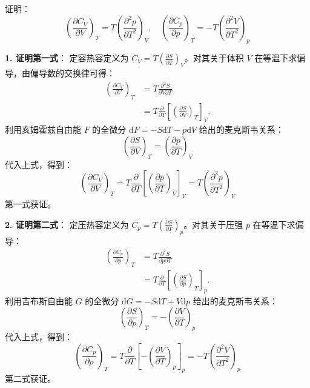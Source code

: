 \begin{exercise}\label{ex:12.11}
证明：
$$ \left(\frac{\partial C_V}{\partial V}\right)_T = T \left(\frac{\partial^2 p}{\partial T^2}\right)_V, \quad \left(\frac{\partial C_p}{\partial p}\right)_T = -T \left(\frac{\partial^2 V}{\partial T^2}\right)_p $$
\end{exercise}
\begin{solution}
\textbf{1. 证明第一式}：
定容热容定义为 $C_V = T \left(\frac{\partial S}{\partial T}\right)_V$。对其关于体积 $V$ 在等温下求偏导，由偏导数的交换律可得：
\[
\begin{aligned}
\left(\frac{\partial C_V}{\partial V}\right)_T
 &=T\frac{\partial^2S}{\partial V\partial T}\\
 &=T\frac{\partial}{\partial T}
   \left[\left(\frac{\partial S}{\partial V}\right)_T\right]_V.
\end{aligned}
\]
利用亥姆霍兹自由能 $F$ 的全微分 $\mathrm{d}F = -S\mathrm{d}T - p\mathrm{d}V$ 给出的麦克斯韦关系：
$$ \left(\frac{\partial S}{\partial V}\right)_T = \left(\frac{\partial p}{\partial T}\right)_V $$
代入上式，得到：
$$ \left(\frac{\partial C_V}{\partial V}\right)_T = T \frac{\partial}{\partial T} \left[ \left(\frac{\partial p}{\partial T}\right)_V \right]_V = T \left(\frac{\partial^2 p}{\partial T^2}\right)_V $$
第一式获证。

\textbf{2. 证明第二式}：
定压热容定义为 $C_p = T \left(\frac{\partial S}{\partial T}\right)_p$。对其关于压强 $p$ 在等温下求偏导：
\[
\begin{aligned}
\left(\frac{\partial C_p}{\partial p}\right)_T
 &=T\frac{\partial^2S}{\partial p\partial T}\\
 &=T\frac{\partial}{\partial T}
   \left[\left(\frac{\partial S}{\partial p}\right)_T\right]_p.
\end{aligned}
\]
利用吉布斯自由能 $G$ 的全微分 $\mathrm{d}G = -S\mathrm{d}T + V\mathrm{d}p$ 给出的麦克斯韦关系：
$$ \left(\frac{\partial S}{\partial p}\right)_T = -\left(\frac{\partial V}{\partial T}\right)_p $$
代入上式，得到：
$$ \left(\frac{\partial C_p}{\partial p}\right)_T = T \frac{\partial}{\partial T} \left[ -\left(\frac{\partial V}{\partial T}\right)_p \right]_p = -T \left(\frac{\partial^2 V}{\partial T^2}\right)_p $$
第二式获证。
\end{solution}


